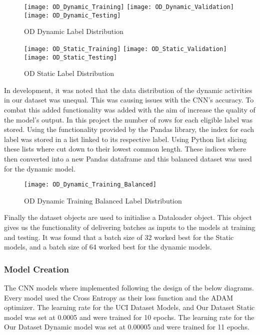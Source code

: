        \begin{figure}[h]
        \centering
        \texttt{[image: OD\_Dynamic\_Training]}\hfill
        \texttt{[image: OD\_Dynamic\_Validation]}\hfill
        \texttt{[image: OD\_Dynamic\_Testing]}
        \caption{OD Dynamic Label Distribution}
        \label{fig:figureX}
        \end{figure}

        \begin{figure}[h]
        \centering
        \texttt{[image: OD\_Static\_Training]}\hfill
        \texttt{[image: OD\_Static\_Validation]}\hfill
        \texttt{[image: OD\_Static\_Testing]}
        \caption{OD Static Label Distribution}
        \label{fig:figureX}
        \end{figure}

        In development, it was noted that the data distribution of the dynamic activities in our dataset was unequal.
        This was causing issues with the CNN's accuracy.
        To combat this added functionality was added with the aim of increase the quality of the model's output.
        In this project the number of rows for each eligible label was stored.
        Using the functionality provided by the Pandas library, the index for each label was stored in a list linked to its respective label.
        Using Python list slicing these lists where cut down to their lowest common length.
        These indices where then converted into a new Pandas dataframe and this balanced dataset was used for the dynamic model.

        \begin{figure}[h]
        \centering
        \texttt{[image: OD\_Dynamic\_Training\_Balanced]}\hfill
        \caption{OD Dynamic Training Balanced Label Distribution}
        \label{fig:figureX}
        \end{figure}

        Finally the dataset objects are used to initialise a Dataloader object.
        This object gives us the functionality of delivering batches as inputs to the models at training and testing.
        It was found that a batch size of 32 worked best for the Static models, and a batch size of 64 worked best for the dynamic models.

    \subsubsection{Model Creation}
        The CNN models where implemented following the design of the below diagrams.
        Every model used the Cross Entropy as their loss function and the ADAM optimizer.
        The learning rate for the UCI Dataset Models, and Our Dataset Static model was set at 0.0005 and were trained for 10 epochs.
        The learning rate for the Our Dataset Dynamic model was set at 0.00005 and were trained for 11 epochs.


